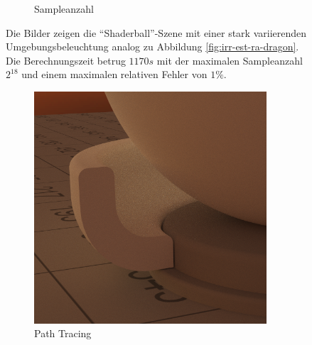 \begin{figure}[h]
\begin{subfigure}[t]{0.33\textwidth}
				\caption{Sampleanzahl}
			\end{subfigure}
			\caption[Erste adaptive Vertex-Irradiance-Map anhand der \enquote{Shaderball}-Szene]{Die Bilder zeigen die \enquote{Shaderball}-Szene mit einer stark variierenden Umgebungsbeleuchtung analog zu Abbildung \ref{fig:irr-est-ra-dragon}. Die Berechnungszeit betrug $1170\unit{s}$ mit der maximalen Sampleanzahl $2^{18}$ und einem maximalen relativen Fehler von $1\unit{\%}$.}
			\label{fig:irr-est-ra-shaderball}
		\end{figure}

		\begin{figure}[h]
			\begin{subfigure}[t]{0.33\textwidth}
				\center
				\includegraphics[width=0.95\textwidth]{pic/irr_est-ra-shaderball2-ref.png}
				\caption{Path Tracing}
			\end{subfigure}
			\begin{subfigure}[t]{0.33\textwidth}
				\center

\end{subfigure}
\end{figure}
